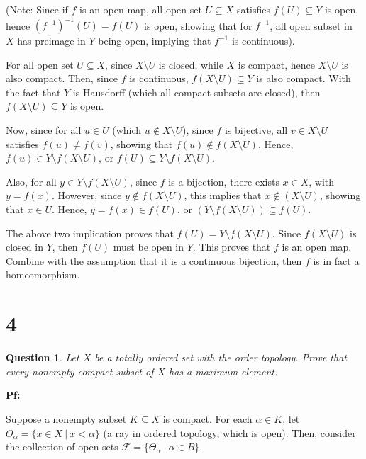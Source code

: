 \documentclass{article}
\newtheorem{question}{Question}
\begin{document}
(Note: Since if $f$ is an open map, all open set $U\subseteq X$ satisfies $f(U)\subseteq Y$ is open, hence $(f^{-1})^{-1}(U) = f(U)$ is open, 
showing that for $f^{-1}$, all open subset in $X$ has preimage in $Y$ being open, implying that $f^{-1}$ is continuous).

For all open set $U\subseteq X$, since $X\setminus U$ is closed, while $X$ is compact, hence $X\setminus U$ is also compact.
Then, since $f$ is continuous, $f(X\setminus U)\subseteq Y$ is also compact. With the fact that $Y$ is Hausdorff (which all compact subsets are closed),
then $f(X\setminus U)\subseteq Y$ is open.

\hfil

Now, since for all $u\in U$ (which $u\notin X\setminus U$), since $f$ is bijective, all $v\in X\setminus U$ satisfies $f(u)\neq f(v)$,
showing that $f(u)\notin f(X\setminus U)$. Hence, $f(u)\in Y\setminus f(X\setminus U)$, or $f(U)\subseteq Y\setminus f(X\setminus U)$.

Also, for all $y\in Y\setminus f(X\setminus U)$, since $f$ is a bijection, there exists $x\in X$, with $y=f(x)$.
However, since $y\notin f(X\setminus U)$, this implies that $x\notin (X\setminus U)$, showing that $x\in U$.
Hence, $y=f(x)\in f(U)$, or $(Y\setminus f(X\setminus U))\subseteq f(U)$.

\hfil

The above two implication proves that $f(U)=Y\setminus f(X\setminus U)$. Since $f(X\setminus U)$ is closed in $Y$, then $f(U)$ must be open in $Y$.
This proves that $f$ is an open map. Combine with the assumption that it is a continuous bijection, then $f$ is in fact a homeomorphism.

\break

\section*{4}
\begin{myBox}[]{}
    \begin{question}
        Let $X$ be a totally ordered set with the order topology. Prove that every
        nonempty compact subset of $X$ has a maximum element.
    \end{question}
\end{myBox}

\textbf{Pf:}

Suppose a nonempty subset $K\subseteq X$ is compact. For each $\alpha\in K$, let $\Theta_\alpha = \{x\in X\ |\ x<\alpha\}$ (a ray in ordered topology, which is open).
Then, consider the collection of open sets $\mathcal{F}=\{\Theta_\alpha\ |\ \alpha\in B\}$.
\end{document}
